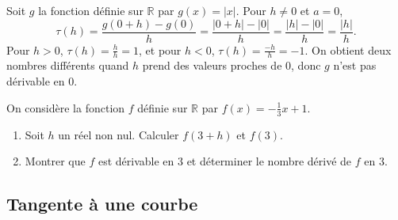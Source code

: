 \documentclass[11pt]{article}
\begin{document}
\begin{exemple}
  \begin{minipage}{.7\textwidth}
  Soit $g$ la fonction définie sur $\mathbb{R}$ par $g(x)=|x|$. Pour $h\neq0$ et
  $a=0$,
  \[
    \tau(h)=\frac{g(0+h)-g(0)}{h}=\frac{|0+h|-|0|}{h}=\frac{|h|-|0|}{h}=\frac{|h|}{h}.
  \]
  Pour $h>0$, $\tau(h)=\frac{h}{h}=1$, et pour $h<0$,
  $\tau(h)=\frac{-h}{h}=-1$. On obtient deux nombres différents quand $h$ prend
  des valeurs proches de $0$, donc $g$ n'est pas dérivable en $0$.
\end{minipage}
  \begin{minipage}{.3\textwidth}
  \begin{center}
  \end{center}
\end{minipage}
\end{exemple}
\begin{app}
  On considère la fonction $f$ définie sur $\mathbb{R}$ par
  $f(x)=-\frac{1}{3}x+1$.
  \begin{enumerate}
    \item Soit $h$ un réel non nul. Calculer $f(3+h)$ et $f(3)$.
    \item Montrer que $f$ est dérivable en $3$ et déterminer le nombre dérivé de
      $f$ en $3$.
  \end{enumerate}
\end{app}

\subsection{Tangente à une courbe}
\end{document}
